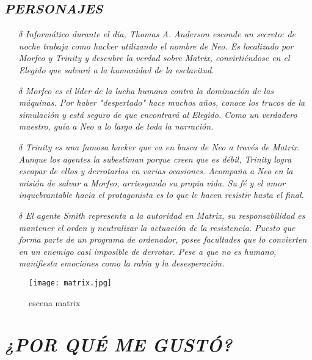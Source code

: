 \documentclass[A5paper 11pt]{article}
\begin{document}
\subsection{\textit{PERSONAJES}}
\begin{itemize}
    \item[$\delta$] \textit{Informático durante el día, Thomas A. Anderson esconde un secreto: de noche trabaja como hacker utilizando el nombre de Neo. Es localizado por Morfeo y Trinity y descubre la verdad sobre Matrix, convirtiéndose en el Elegido que salvará a la humanidad de la esclavitud.}
    \item[$\delta$] \textit{Morfeo es el líder de la lucha humana contra la dominación de las máquinas. Por haber "despertado" hace muchos años, conoce los trucos de la simulación y está seguro de que encontrará al Elegido. Como un verdadero maestro, guía a Neo a lo largo de toda la narración.}
    \item[$\delta$]\textit{Trinity es una famosa hacker que va en busca de Neo a través de Matrix. Aunque los agentes la subestiman porque creen que es débil, Trinity logra escapar de ellos y derrotarlos en varias ocasiones. Acompaña a Neo en la misión de salvar a Morfeo, arriesgando su propia vida. Su fé y el amor inquebrantable hacia el protagonista es lo que le hacen resistir hasta el final.}
    \item[$\delta$]\textit{El agente Smith representa a la autoridad en Matrix, su responsabilidad es mantener el orden y neutralizar la actuación de la resistencia. Puesto que forma parte de un programa de ordenador, posee facultades que lo convierten en un enemigo casi imposible de derrotar. Pese a que no es humano, manifiesta emociones como la rabia y la desesperación.}
     
\end{itemize}
  
\newpage
%   

   \begin{figure}
     \raggedleft 
     \caption{escena matrix} 
 \texttt{[image: matrix.jpg]}
 
     \end{figure}



\section{\textit{¿POR QUÉ ME GUSTÓ?}}
\end{document}
